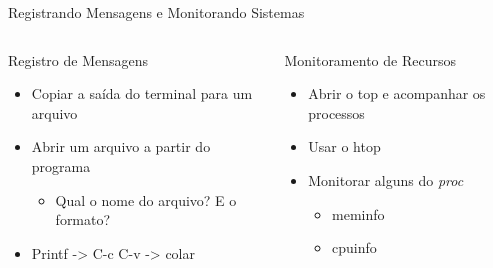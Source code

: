 \documentclass[10pt, compress, aspectratio=169, xcolor={table,usenames,dvipsnames}]{beamer}
\begin{document}
\begin{frame}[label={sec:org5245ffb},t,fragile]{Registrando Mensagens e Monitorando Sistemas}
\begin{columns}
\begin{column}{0.5\columnwidth}
\begin{block}{Registro de Mensagens}
\begin{itemize}
\item Copiar a saída do terminal para um arquivo
\item Abrir um arquivo a partir do programa
\begin{itemize}
\item Qual o nome do arquivo? E o formato?
\end{itemize}
\item Printf -> C-c C-v -> colar
\end{itemize}
\end{block}
\end{column}

\begin{column}{0.5\columnwidth}
\begin{block}{Monitoramento de Recursos}
\begin{itemize}
\item Abrir o top e acompanhar os processos
\item Usar o htop
\item Monitorar alguns do \emph{proc}
\begin{itemize}
\item meminfo
\item cpuinfo
\end{itemize}
\end{itemize}
\end{block}
\end{column}
\end{columns}
\end{frame}
\end{document}
